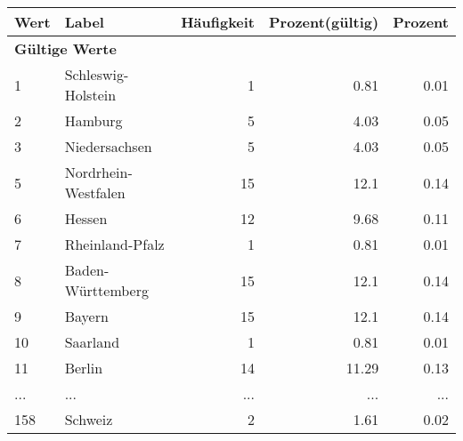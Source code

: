     \begin{longtable}{lXrrr}
     \toprule
     \textbf{Wert} & \textbf{Label} & \textbf{Häufigkeit} & \textbf{Prozent(gültig)} & \textbf{Prozent} \\
     \endhead
     \midrule
     \multicolumn{5}{l}{\textbf{Gültige Werte}}\\
        1 & \multicolumn{1}{X}{Schleswig-Holstein} & %
          \num{1} &
          \num[round-mode=places,round-precision=2]{0.81} &
          \num[round-mode=places,round-precision=2]{0.01} \\
        2 & \multicolumn{1}{X}{Hamburg} & %
          \num{5} &
          \num[round-mode=places,round-precision=2]{4.03} &
          \num[round-mode=places,round-precision=2]{0.05} \\
        3 & \multicolumn{1}{X}{Niedersachsen} & %
          \num{5} &
          \num[round-mode=places,round-precision=2]{4.03} &
          \num[round-mode=places,round-precision=2]{0.05} \\
        5 & \multicolumn{1}{X}{Nordrhein-Westfalen} & %
          \num{15} &
          \num[round-mode=places,round-precision=2]{12.1} &
          \num[round-mode=places,round-precision=2]{0.14} \\
        6 & \multicolumn{1}{X}{Hessen} & %
          \num{12} &
          \num[round-mode=places,round-precision=2]{9.68} &
          \num[round-mode=places,round-precision=2]{0.11} \\
        7 & \multicolumn{1}{X}{Rheinland-Pfalz} & %
          \num{1} &
          \num[round-mode=places,round-precision=2]{0.81} &
          \num[round-mode=places,round-precision=2]{0.01} \\
        8 & \multicolumn{1}{X}{Baden-Württemberg} & %
          \num{15} &
          \num[round-mode=places,round-precision=2]{12.1} &
          \num[round-mode=places,round-precision=2]{0.14} \\
        9 & \multicolumn{1}{X}{Bayern} & %
          \num{15} &
          \num[round-mode=places,round-precision=2]{12.1} &
          \num[round-mode=places,round-precision=2]{0.14} \\
        10 & \multicolumn{1}{X}{Saarland} & %
          \num{1} &
          \num[round-mode=places,round-precision=2]{0.81} &
          \num[round-mode=places,round-precision=2]{0.01} \\
        11 & \multicolumn{1}{X}{Berlin} & %
          \num{14} &
          \num[round-mode=places,round-precision=2]{11.29} &
          \num[round-mode=places,round-precision=2]{0.13} \\
       ... & ... & ... & ... & ... \\
        158 & \multicolumn{1}{X}{Schweiz} & %
          \num{2} &
          \num[round-mode=places,round-precision=2]{1.61} &
          \num[round-mode=places,round-precision=2]{0.02} \\


\end{longtable}
